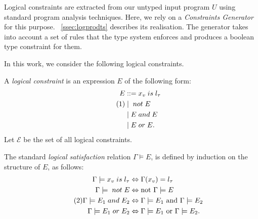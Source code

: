 \documentclass[acmsmall, review, anonymous]{acmart}\settopmatter{printfolios=true,printccs=false,printacmref=false}
\newcommand\numberthis{\addtocounter{equation}{1}\tag{\theequation}}
\begin{document}

Logical constraints are extracted from our untyped input program $U$ using
standard program analysis techniques.  Here, we rely on a \emph{Constraints
	Generator} for this purpose. ~\autoref{ssec:logprodts} describes its
realisation.  The generator takes into account a set of rules that the type system
enforces and produces a boolean type constraint for them.

In this work, we consider the following logical constraints.
\begin{definition}\label{def:log-gram}
	A \emph{logical constraint} is an expression $E$ of the following form:
	\begin{align*}
		E & ::= x_v \mathrel{is} l_\tau \\ \numberthis\label{eq:gram}
		  & \mid{} \mathrel{not} E      \\
		  & \mid E \mathrel{and} E      \\
		  & \mid E \mathrel{or} E.
	\end{align*}
	Let $\mathcal{E}$ be the set of all logical constraints.
\end{definition}
The standard \emph{logical satisfaction} relation $\Gamma \models E$, is defined by induction on the structure of $E$, as follows:
          \begin{align*} 
              \Gamma \models x_v \mathrel{is} l_\tau & \Leftrightarrow \Gamma(x_v)=l_\tau                                  \\
              \Gamma \models{} \mathrel{not} E       & \Leftrightarrow{} \mbox{not $\Gamma \models E$}                    \\ \numberthis \label{eq:logsat}
              \Gamma \models E_1 \mathrel{and} E_2   & \Leftrightarrow
              \mbox{$\Gamma \models E_1$ and $\Gamma \models E_2$} \\
              \Gamma \models E_1 \mathrel{or} E_2
                                                     & \Leftrightarrow
        \mbox{$\Gamma \models E_1$ or $\Gamma \models E_2$.}
          \end{align*}
\end{document}
